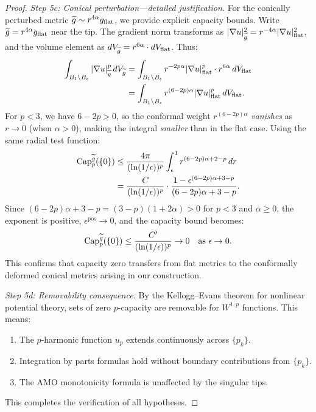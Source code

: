 \begin{proof}
\textit{Step 5c: Conical perturbation---detailed justification.}
For the conically perturbed metric $\widetilde{g} \sim r^{4\alpha} g_{\text{flat}}$, we provide explicit capacity bounds. Write $\widetilde{g} = r^{4\alpha} g_{\text{flat}}$ near the tip. The gradient norm transforms as $|\nabla u|_{\widetilde{g}}^2 = r^{-4\alpha} |\nabla u|_{\text{flat}}^2$, and the volume element as $dV_{\widetilde{g}} = r^{6\alpha} \cdot dV_{\text{flat}}$. Thus:
\begin{align*}
    \int_{B_1 \setminus B_\epsilon} |\nabla u|_{\widetilde{g}}^p \, dV_{\widetilde{g}} &= \int_{B_1 \setminus B_\epsilon} r^{-2p\alpha} |\nabla u|_{\text{flat}}^p \cdot r^{6\alpha} \, dV_{\text{flat}} \\
    &= \int_{B_1 \setminus B_\epsilon} r^{(6-2p)\alpha} |\nabla u|_{\text{flat}}^p \, dV_{\text{flat}}.
\end{align*}
For $p < 3$, we have $6 - 2p > 0$, so the conformal weight $r^{(6-2p)\alpha}$ \emph{vanishes} as $r \to 0$ (when $\alpha > 0$), making the integral \emph{smaller} than in the flat case. Using the same radial test function:
\begin{align*}
    \mathrm{Cap}_p^{\widetilde{g}}(\{0\}) &\le \frac{4\pi}{(\ln(1/\epsilon))^p} \int_\epsilon^1 r^{(6-2p)\alpha + 2 - p} \, dr \\
    &= \frac{C}{(\ln(1/\epsilon))^p} \cdot \frac{1 - \epsilon^{(6-2p)\alpha + 3-p}}{(6-2p)\alpha + 3-p}.
\end{align*}
Since $(6-2p)\alpha + 3 - p = (3-p)(1 + 2\alpha) > 0$ for $p < 3$ and $\alpha \ge 0$, the exponent is positive, $\epsilon^{\text{pos}} \to 0$, and the capacity bound becomes:
\begin{equation}
    \mathrm{Cap}_p^{\widetilde{g}}(\{0\}) \le \frac{C'}{(\ln(1/\epsilon))^p} \to 0 \quad \text{as } \epsilon \to 0.
\end{equation}
This confirms that capacity zero transfers from flat metrics to the conformally deformed conical metrics arising in our construction.

\textit{Step 5d: Removability consequence.}
By the Kellogg--Evans theorem for nonlinear potential theory, sets of zero $p$-capacity are removable for $W^{1,p}$ functions. This means:
\begin{enumerate}
    \item The $p$-harmonic function $u_p$ extends continuously across $\{p_k\}$.
    \item Integration by parts formulas hold without boundary contributions from $\{p_k\}$.
    \item The AMO monotonicity formula is unaffected by the singular tips.
\end{enumerate}

This completes the verification of all hypotheses.
\end{proof}

